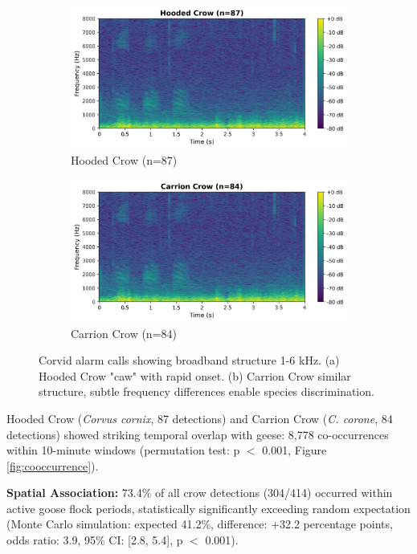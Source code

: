 \documentclass[twocolumn]{article}
\begin{document}
\begin{figure}[H]
\centering
\begin{subfigure}{0.48\columnwidth}
\includegraphics[width=\textwidth]{figures/spectrogram_hooded_crow.png}
\caption{Hooded Crow (n=87)}
\end{subfigure}
\hfill
\begin{subfigure}{0.48\columnwidth}
\includegraphics[width=\textwidth]{figures/spectrogram_carrion_crow.png}
\caption{Carrion Crow (n=84)}
\end{subfigure}
\caption{Corvid alarm calls showing broadband structure 1-6 kHz. (a) Hooded Crow "caw" with rapid onset. (b) Carrion Crow similar structure, subtle frequency differences enable species discrimination.}
\label{fig:corvid_spectrograms}
\end{figure}

Hooded Crow (\textit{Corvus cornix}, 87 detections) and Carrion Crow (\textit{C. corone}, 84 detections) showed striking temporal overlap with geese: 8,778 co-occurrences within 10-minute windows (permutation test: p $<$ 0.001, Figure \ref{fig:cooccurrence}).

\textbf{Spatial Association:} 73.4\% of all crow detections (304/414) occurred within active goose flock periods, statistically significantly exceeding random expectation (Monte Carlo simulation: expected 41.2\%, difference: +32.2 percentage points, odds ratio: 3.9, 95\% CI: [2.8, 5.4], p $<$ 0.001).
\end{document}
